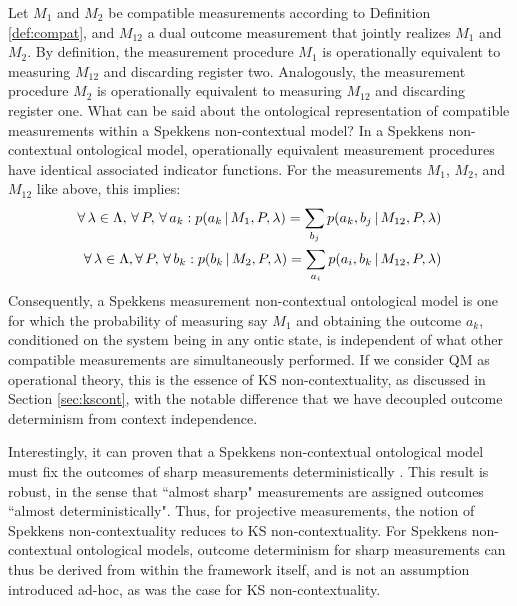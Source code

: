 Let $M_{1}$ and $M_{2}$ be compatible measurements according to Definition \ref{def:compat}, and $M_{12}$ a dual outcome measurement that jointly realizes $M_1$ and $M_2$. By definition, the measurement procedure $M_{1}$ is operationally equivalent to measuring $M_{12}$ and discarding register two. Analogously, the measurement procedure $M_{2}$ is operationally equivalent to measuring $M_{12}$ and discarding register one. What can be said about the ontological representation of compatible measurements within a Spekkens non-contextual model? In a Spekkens non-contextual ontological model, operationally equivalent measurement procedures have identical associated indicator functions. For the measurements $M_{1}$, $M_{2}$, and $M_{12}$ like above, this implies:
\begin{align*}
\forall\thinspace\lambda\in\Lambda,\thinspace\forall \thinspace P,\thinspace\forall\thinspace a_{k}:p(a_{k}\thinspace\vert\thinspace M_{1},P,\lambda)=\sum_{b_{j}}p(a_{k},b_{j}\thinspace\vert\thinspace M_{12},P,\lambda)\\
\forall\thinspace\lambda\in\Lambda,\forall\thinspace P,\thinspace\forall\thinspace b_{k}:p(b_{k}\thinspace\vert\thinspace M_{2},P,\lambda)=\sum_{a_{i}}p(a_{i},b_{k}\thinspace\vert\thinspace M_{12},P,\lambda)
\end{align*}
Consequently, a Spekkens measurement non-contextual ontological model is one for which the probability of measuring say $M_{1}$ and obtaining the outcome $a_{k}$, conditioned on the system being in any ontic state, is independent of what other compatible measurements are simultaneously performed. If we consider QM as operational theory, this is the essence of KS non-contextuality, as discussed in Section \ref{sec:kscont}, with the notable difference that we have decoupled outcome determinism from context independence.

Interestingly, it can proven that a Spekkens non-contextual ontological model must fix the outcomes of sharp measurements deterministically \cite{Spekkens2014}. This result is robust, in the sense that ``almost sharp" measurements are assigned outcomes ``almost deterministically". Thus, for projective measurements, the notion of Spekkens non-contextuality reduces to KS non-contextuality. For Spekkens non-contextual ontological models, outcome determinism for sharp measurements can thus be derived from within the framework itself, and is not an assumption introduced ad-hoc, as was the case for KS non-contextuality.